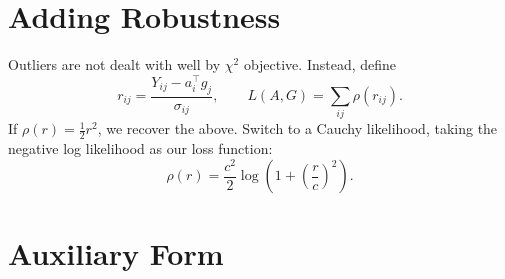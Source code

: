 \documentclass[11pt]{article}
\begin{document}
\section*{Adding Robustness}

Outliers are not dealt with well by $\chi^2$ objective. 
Instead, define
\begin{equation}
    r_{ij} = \frac{Y_{ij} - a_i^\top g_j}{\sigma_{ij}}, \qquad 
    L(A,G) = \sum_{ij} \rho(r_{ij}).
\end{equation}
If $\rho(r) = \tfrac{1}{2} r^2$, we recover the above. 
Switch to a Cauchy likelihood, taking the negative log likelihood as our loss function:
\begin{equation}
    \rho(r) = \frac{c^2}{2} \log\!\left(1 + \left(\frac{r}{c}\right)^2\right).
\end{equation}

\section*{Auxiliary Form}
\end{document}
